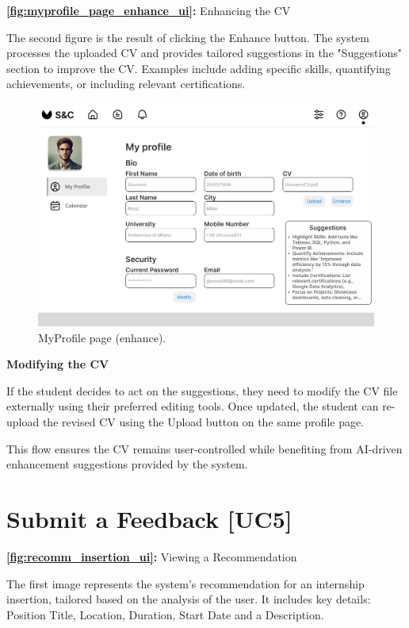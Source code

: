 \textbf{\autoref{fig:myprofile_page_enhance_ui}:} Enhancing the CV

The second figure is the result of clicking the Enhance button. The system processes the uploaded CV and provides tailored suggestions in the "Suggestions" section to improve the CV. Examples include adding specific skills, quantifying achievements, or including relevant certifications.

\begin{figure}[H]
    \centering
    \includegraphics[width=0.75\linewidth]{DD/Images/UI/MyProfile_enhanceCV.png}
    \caption{MyProfile page (enhance).}
    \label{fig:myprofile_page_enhance_ui}
\end{figure}

\textbf{Modifying the CV}

If the student decides to act on the suggestions, they need to modify the CV file externally using their preferred editing tools. Once updated, the student can re-upload the revised CV using the Upload button on the same profile page.

This flow ensures the CV remains user-controlled while benefiting from AI-driven enhancement suggestions provided by the system.

\newpage

\section{Submit a Feedback [UC5]}
\label{sec:UI4_submit_feedback}%

\textbf{\autoref{fig:recomm_insertion_ui}:} Viewing a Recommendation

The first image represents the system’s recommendation for an internship insertion, tailored based on the analysis of the user. It includes key details:
Position Title, Location, Duration, Start Date and a Description.


